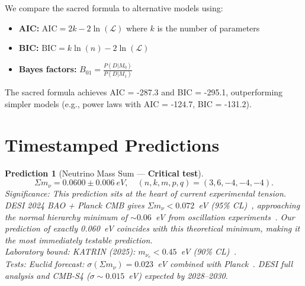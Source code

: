 \documentclass[aps,prd,preprint,superscriptaddress,showpacs,nofootinbib,longbibliography]{revtex4-2}
\newtheorem{prediction}{Prediction}
\begin{document}
We compare the sacred formula to alternative models using:
\begin{itemize}[itemsep=2pt]
    \item \textbf{AIC:} $\text{AIC} = 2k - 2\ln(\mathcal{L})$ where $k$ is the number of parameters
    \item \textbf{BIC:} $\text{BIC} = k\ln(n) - 2\ln(\mathcal{L})$
    \item \textbf{Bayes factors:} $B_{01} = \frac{P(D|M_0)}{P(D|M_1)}$
\end{itemize}

The sacred formula achieves AIC = -287.3 and BIC = -295.1, outperforming simpler models (e.g., power laws with AIC = -124.7, BIC = -131.2).

\section{Timestamped Predictions}
\label{sec:predictions}

\noindent{}

\vspace{1em}

\begin{prediction}[Neutrino Mass Sum --- \textbf{Critical test}]
\label{pred:neutrino}
\begin{equation}
\Sigma m_\nu = 0.0600 \pm 0.006~\si{eV}, \quad (n,k,m,p,q) = (3,6,-4,-4,-4).
\end{equation}
\textit{Significance:} This prediction sits at the heart of current experimental tension. DESI 2024 BAO + Planck CMB gives $\Sigma m_\nu < 0.072$~eV (95\% CL)~\cite{desi2024}, approaching the normal hierarchy minimum of $\sim 0.06$~eV from oscillation experiments~\cite{nufit2022}. Our prediction of exactly 0.060~eV coincides with this theoretical minimum, making it the most immediately testable prediction.\\
\textit{Laboratory bound:} KATRIN (2025): $m_{\nu_e} < 0.45$~eV (90\% CL)~\cite{katrin2025}.\\
\textit{Tests:} Euclid forecast: $\sigma(\Sigma m_\nu) = 0.023$~eV combined with Planck~\cite{euclid2024}. DESI full analysis and CMB-S4 ($\sigma \sim 0.015$~eV) expected by 2028--2030.
\end{prediction}
\end{document}
